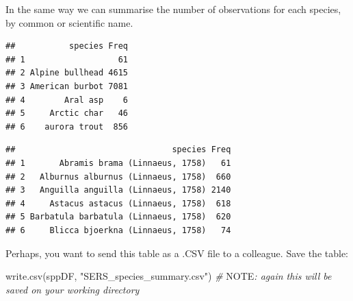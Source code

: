 \documentclass[
  10pt,
]{article}
\newenvironment{Shaded}{\begin{snugshade}}{\end{snugshade}}
\newcommand{\AlertTok}[1]{\textcolor[rgb]{0.94,0.16,0.16}{#1}}
\newcommand{\CommentTok}[1]{\textcolor[rgb]{0.56,0.35,0.01}{\textit{#1}}}
\newcommand{\DecValTok}[1]{\textcolor[rgb]{0.00,0.00,0.81}{#1}}
\newcommand{\FunctionTok}[1]{\textcolor[rgb]{0.00,0.00,0.00}{#1}}
\newcommand{\NormalTok}[1]{#1}
\newcommand{\OtherTok}[1]{\textcolor[rgb]{0.56,0.35,0.01}{#1}}
\newcommand{\SpecialCharTok}[1]{\textcolor[rgb]{0.00,0.00,0.00}{#1}}
\newcommand{\StringTok}[1]{\textcolor[rgb]{0.31,0.60,0.02}{#1}}
\begin{document}
In the same way we can summarise the number of observations for each species, by common or scientific name.

\begin{Shaded}
\end{Shaded}

\begin{verbatim}
##           species Freq
## 1                   61
## 2 Alpine bullhead 4615
## 3 American burbot 7081
## 4        Aral asp    6
## 5     Arctic char   46
## 6    aurora trout  856
\end{verbatim}

\begin{Shaded}
\end{Shaded}

\begin{verbatim}
##                                species Freq
## 1       Abramis brama (Linnaeus, 1758)   61
## 2   Alburnus alburnus (Linnaeus, 1758)  660
## 3   Anguilla anguilla (Linnaeus, 1758) 2140
## 4     Astacus astacus (Linnaeus, 1758)  618
## 5 Barbatula barbatula (Linnaeus, 1758)  620
## 6     Blicca bjoerkna (Linnaeus, 1758)   74
\end{verbatim}

Perhaps, you want to send this table as a .CSV file to a colleague. Save the table:

\begin{Shaded}
\begin{Highlighting}[]
\FunctionTok{write.csv}\NormalTok{(sppDF, }\StringTok{"SERS\_species\_summary.csv"}\NormalTok{)}
\CommentTok{\# }\AlertTok{NOTE}\CommentTok{: again this will be saved on your working directory}
\end{Highlighting}
\end{Shaded}
\end{document}

